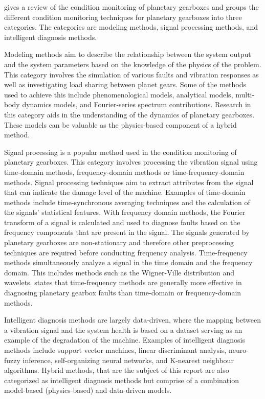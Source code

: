 \cite{Lei2014} gives a review of the condition monitoring of planetary gearboxes and groups the different condition monitoring techniques for planetary gearboxes into three categories. The categories are modeling methods, signal processing methods, and intelligent diagnosis methods. 

Modeling methods aim to describe the relationship between the system output and the system parameters based on the knowledge of the physics of the problem. This category involves the simulation of various faults and vibration responses as well as investigating load sharing between planet gears. Some of the methods used to achieve this include phenomenological models, analytical models, multi-body dynamics models, and Fourier-series spectrum contributions. Research in this category aids in the understanding of the dynamics of planetary gearboxes. These models can be valuable as the physics-based component of a hybrid method. 

Signal processing is a popular method used in the condition monitoring of planetary gearboxes. This category involves processing the vibration signal using time-domain methods, frequency-domain methods or time-frequency-domain methods. Signal processing techniques aim to extract attributes from the signal that can indicate the damage level of the machine. Examples of time-domain methods include time-synchronous averaging techniques and the calculation of the signals' statistical features.
With frequency domain methods, the Fourier transform of a signal is calculated and used to diagnose faults based on the frequency components that are present in the signal. The signals generated by planetary gearboxes are non-stationary and therefore other preprocessing techniques are required before conducting frequency analysis.
Time-frequency methods simultaneously analyze a signal in the time domain and the frequency domain. This includes methods such as the Wigner-Ville distribution and wavelets. \cite{Lei2014} states that time-frequency methods are generally more effective in diagnosing planetary gearbox faults than time-domain or frequency-domain methods.

Intelligent diagnosis methods are largely data-driven, where the mapping between a vibration signal and the system health is based on a dataset serving as an example of the degradation of the machine. Examples of intelligent diagnosis methods include support vector machines, linear discriminant analysis, neuro-fuzzy inference, self-organizing neural networks, and K-nearest neighbour algorithms. Hybrid methods, that are the subject of this report are also categorized as intelligent diagnosis methods but comprise of a combination model-based (physics-based) and data-driven models. 


